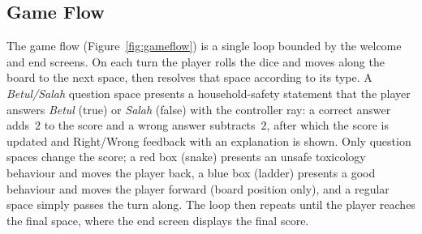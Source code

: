 \documentclass[a4paper,12pt]{article}
\begin{document}
\subsection{Game Flow}

The game flow (Figure~\ref{fig:gameflow}) is a single loop bounded by the welcome and end screens. On each turn the player rolls the dice and moves along the board to the next space, then resolves that space according to its type. A \emph{Betul/Salah} question space presents a household-safety statement that the player answers \emph{Betul} (true) or \emph{Salah} (false) with the controller ray: a correct answer adds~$2$ to the score and a wrong answer subtracts~$2$, after which the score is updated and Right/Wrong feedback with an explanation is shown. Only question spaces change the score; a red box (snake) presents an unsafe toxicology behaviour and moves the player back, a blue box (ladder) presents a good behaviour and moves the player forward (board position only), and a regular space simply passes the turn along. The loop then repeats until the player reaches the final space, where the end screen displays the final score.
\end{document}
